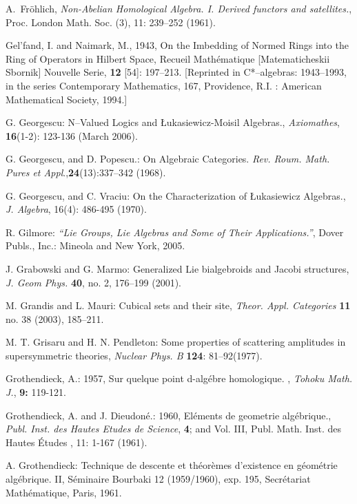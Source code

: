\documentclass[12pt]{article}
\theoremstyle{plain}
\theoremstyle{definition}
\numberwithin{equation}{section}
\newcommand{\<}{{\langle}}
\begin{document}
\begin{thebibliography}{99}
A.~Fr{\"o}hlich, {\em Non-{A}belian Homological Algebra. {I}.
{D}erived functors and satellites.\/}, Proc. London Math. Soc. (3), 11: 239--252 (1961).

Gel'fand, I. and Naimark, M., 1943, On the Imbedding of Normed Rings into the Ring of 
Operators in Hilbert Space, Recueil Math\'ematique [Matematicheskii Sbornik] Nouvelle Serie, \textbf{12} [54]: 197--213. [Reprinted in C*--algebras: 1943--1993, in the series Contemporary 
Mathematics, 167,  Providence, R.I. : American Mathematical Society, 1994.]

G. Georgescu: N--Valued Logics and \L ukasiewicz-Moisil Algebras.,
\textit{Axiomathes}, \textbf{16}(1-2): 123-136 (March 2006).

G. Georgescu, and D. Popescu.: On Algebraic Categories. \textit{Rev. Roum. Math. Pures et Appl}.,\textbf{24}(13):337--342 (1968).

G. Georgescu, and C. Vraciu:  On the Characterization of \L ukasiewicz Algebras.,
\textit{J. Algebra}, 16(4): 486-495 (1970).

R. Gilmore: \textit{``Lie Groups, Lie Algebras and Some of Their Applications.''},
Dover Publs., Inc.: Mineola and New York, 2005.

J. Grabowski and G. Marmo: Generalized Lie bialgebroids and Jacobi
structures, \emph{J. Geom Phys.} \textbf{40}, no. 2, 176--199 (2001).

M. Grandis and L. Mauri: Cubical sets and their site, \emph{Theor.
Appl. Categories} \textbf{11} no. 38 (2003), 185--211.

M. T. Grisaru and H. N. Pendleton: Some properties of scattering
amplitudes in supersymmetric theories, \emph{Nuclear Phys. B} \textbf{124}: 81--92(1977).


Grothendieck, A.: 1957, Sur quelque point d-alg\'{e}bre homologique. , \emph{Tohoku Math. J.}, \textbf{9:} 119-121.

Grothendieck, A. and J. Dieudon\'{e}.: 1960, El\'{e}ments de geometrie alg\'{e}brique., \emph{Publ. Inst. des Hautes Etudes de Science}, \textbf{4}; and
Vol. III, Publ. Math. Inst. des Hautes \'Etudes , 11: 1-167 (1961).


A. Grothendieck: Technique de descente et th\'eor\`emes d'existence en g\'eom\'etrie alg\'ebrique. II, S\'eminaire Bourbaki 12 (1959/1960), exp. 195, Secr\'etariat Math\'ematique, Paris, 1961.



\end{thebibliography}
\end{document}
